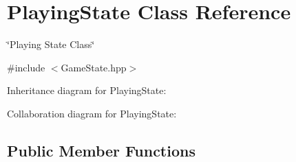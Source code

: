 \hypertarget{classPlayingState}{}\section{Playing\+State Class Reference}
\label{classPlayingState}


\char`\"{}\+Playing State Class\char`\"{}  




{\ttfamily \#include $<$Game\+State.\+hpp$>$}



Inheritance diagram for Playing\+State\+:


Collaboration diagram for Playing\+State\+:
\subsection*{Public Member Functions}
